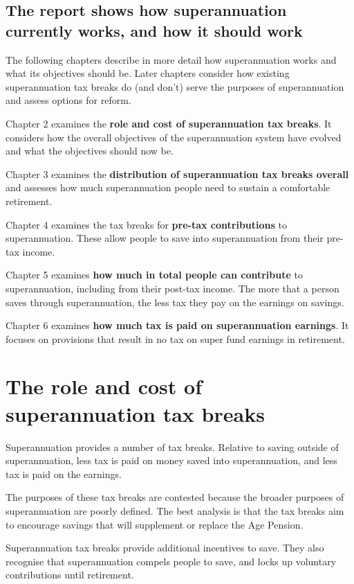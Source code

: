 \section{The report shows how superannuation currently works, and how it should work}
The following chapters describe in more detail how superannuation works and what its objectives should be. Later chapters consider how existing superannuation tax breaks do (and don’t) serve the purposes of superannuation and assess options for reform.

Chapter 2 examines the \textbf{role and cost of superannuation tax breaks}. It considers how the overall objectives of the superannuation system have evolved and what the objectives should now be.

Chapter 3 examines the \textbf{distribution of superannuation tax breaks overall} and assesses how much superannuation people need to sustain a comfortable retirement.  

Chapter 4 examines the tax breaks for \textbf{pre-tax contributions} to superannuation. These allow people to save into superannuation from their pre-tax income.

Chapter 5 examines \textbf{how much in total people can contribute} to superannuation, including from their post-tax income. The more that a person saves through superannuation, the less tax they pay on the earnings on savings.

Chapter 6 examines \textbf{how much tax is paid on superannuation earnings}. It focuses on provisions that result in no tax on super fund earnings in retirement.

%
%
%
\chapter{The role and cost of superannuation tax breaks}
Superannuation provides a number of tax breaks. Relative to saving outside of superannuation, less tax is paid on money saved into superannuation, and less tax is paid on the earnings.

The purposes of these tax breaks are contested because the broader purposes of superannuation are poorly defined. The best analysis is that the tax breaks aim to encourage savings that will supplement or replace the Age Pension. 

Superannuation tax breaks provide additional incentives to save. They also recognise that superannuation compels people to save, and locks up voluntary contributions until retirement.

